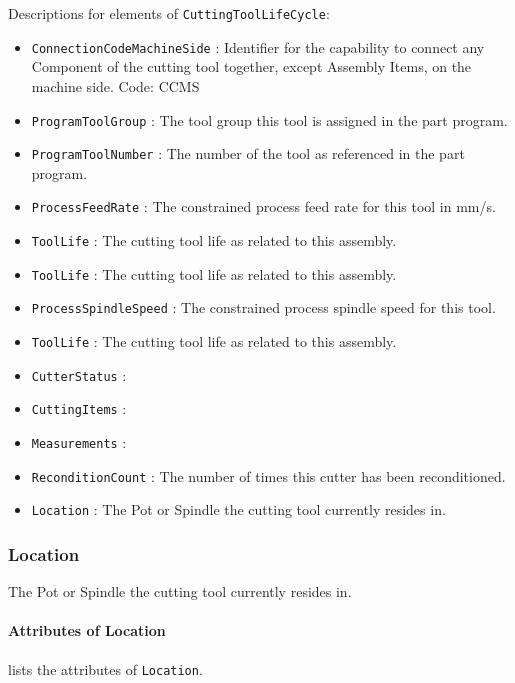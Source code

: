 Descriptions for elements of \texttt{CuttingToolLifeCycle}:

\begin{itemize}
\item \texttt{ConnectionCodeMachineSide} : Identifier for the capability to connect any Component of the cutting tool together, except Assembly Items, on the machine side. Code: CCMS
\item \texttt{ProgramToolGroup} : The tool group this tool is assigned in the part program.
\item \texttt{ProgramToolNumber} : The number of the tool as referenced in the part program.
\item \texttt{ProcessFeedRate} : The constrained process feed rate for this tool in mm/s.
\item \texttt{ToolLife} : The cutting tool life as related to this assembly.
\item \texttt{ToolLife} : The cutting tool life as related to this assembly.
\item \texttt{ProcessSpindleSpeed} : The constrained process spindle speed for this tool.

\item \texttt{ToolLife} : The cutting tool life as related to this assembly.
\item \texttt{CutterStatus} : 
\item \texttt{CuttingItems} : 
\item \texttt{Measurements} : 
\item \texttt{ReconditionCount} : The number of times this cutter has been reconditioned.

\item \texttt{Location} : The Pot or Spindle the cutting tool currently resides in.
\end{itemize}
\FloatBarrier

\subsubsection{Location}
  \label{sec:Location}



The Pot or Spindle the cutting tool currently resides in.


\paragraph{Attributes of Location}\mbox{}
\label{sec:Attributes of Location}

 lists the attributes of \texttt{Location}.


